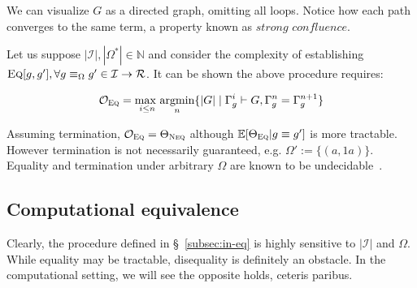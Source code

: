 \documentclass[11pt]{article}
\begin{document}
    \noindent We can visualize $G$ as a directed graph, omitting all loops. Notice how each path converges to the same term, a property known as $\textit{strong confluence}$.

    \hspace{12pt}

    \noindent Let us suppose $|\mathcal{I}|, |\Omega^*| \in \mathbb{N}$ and consider the complexity of establishing $\textsc{Eq}[g, g'], \forall g \equiv_\Omega g' \in \mathcal{I} \rightarrow \mathcal{R}$. It can be shown the above procedure requires:

    $$\mathcal{O}_{\textsc{Eq}} = \underset{i \leq n}{\text{max }}\underset{n}{\text{argmin}}\{|G| \mid \Gamma^i_g \vdash G, \Gamma_g^n = \Gamma_g^{n+1}\}$$ %

    \noindent Assuming termination, $\mathcal{O}_{\textsc{Eq}} = \Theta_{\textsc{Neq}}$ although $\mathbb{E}[\Theta_\textsc{Eq}|g \equiv g']$ is more tractable. However termination is not necessarily guaranteed, e.g. $\Omega' := \{(a, 1a)\}$. Equality and termination under arbitrary $\Omega$ are known to be undecidable~\citep{baader1999term}.

    \subsection{Computational equivalence}\label{subsec:comp-eq}

    Clearly, the procedure defined in \S~\ref{subsec:in-eq} is highly sensitive to $|\mathcal{I}|$ and $\Omega$. While equality may be tractable, disequality is definitely an obstacle. In the computational setting, we will see the opposite holds, ceteris paribus. %
\end{document}

